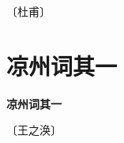 \documentclass[12pt,UTF-8,openany,fontset=none]{ctexbook}
\begin{document}
\begin{center}
    \vspace{10pt}
    
    \begin{large}
        
        〔杜甫〕
        
    \end{large}
    
    \vspace{8pt}
    
    \begin{huge}
        
        \phantom{。}

        \phantom{。}
        
        \phantom{。}

        \phantom{。}
        
    \end{huge}
    
\end{center}

\vspace{8pt}
\clearpage


\section{凉州词其一}



\begin{center}
    {\bfseries 凉州词其一}
\end{center}

\begin{center}
    \vspace{10pt}
    
    \begin{large}
        
        〔王之涣〕
        
    \end{large}
    
    \vspace{8pt}
    
    \begin{huge}
        
        \phantom{。}

        \phantom{。}
        
        \phantom{。}

        \phantom{。}~~
        
    \end{huge}
    
\end{center}
\end{document}
